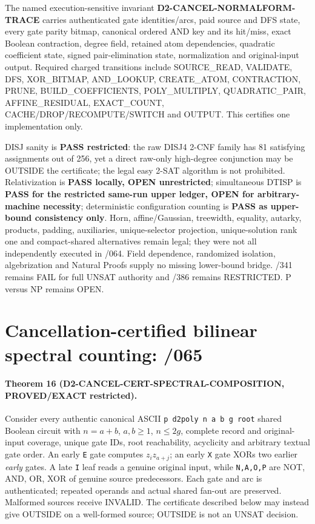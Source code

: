 \documentclass[11pt]{article}
\begin{document}
The named execution-sensitive invariant
\textbf{D2-CANCEL-NORMALFORM-TRACE} carries authenticated gate
identities/arcs, paid source and DFS state, every gate parity bitmap,
canonical ordered AND key and its hit/miss, exact Boolean
contraction, degree field, retained atom dependencies,
quadratic coefficient state, signed pair-elimination state,
normalization and original-input output.  Required charged
transitions include SOURCE\_READ, VALIDATE, DFS, XOR\_BITMAP,
AND\_LOOKUP, CREATE\_ATOM, CONTRACTION, PRUNE,
BUILD\_COEFFICIENTS, POLY\_MULTIPLY, QUADRATIC\_PAIR,
AFFINE\_RESIDUAL, EXACT\_COUNT, CACHE/DROP/RECOMPUTE/SWITCH
and OUTPUT.  This certifies one implementation only.

DISJ sanity is \textbf{PASS restricted}: the raw DISJ4 2-CNF
family has 81 satisfying assignments out of 256, yet a direct
raw-only high-degree conjunction may be OUTSIDE the certificate;
the legal easy 2-SAT algorithm is not prohibited.
Relativization is \textbf{PASS locally, OPEN unrestricted};
simultaneous DTISP is \textbf{PASS for the restricted same-run
upper ledger, OPEN for arbitrary-machine necessity};
deterministic configuration counting is \textbf{PASS as upper-bound
consistency only}.  Horn, affine/Gaussian, treewidth, equality,
autarky, products, padding, auxiliaries, unique-selector projection,
unique-solution rank one and compact-shared alternatives remain legal;
they were not all independently executed in /064.  Field
dependence, randomized isolation, algebrization and Natural
Proofs supply no missing lower-bound bridge.  /341 remains FAIL
for full UNSAT authority and /386 remains RESTRICTED.
P versus NP remains OPEN.


\section{Cancellation-certified bilinear spectral counting: /065}
\paragraph{Theorem 16 (D2-CANCEL-CERT-SPECTRAL-COMPOSITION, PROVED/EXACT restricted).}
Consider every authentic canonical ASCII \texttt{p d2poly n a b g root}
shared Boolean circuit with $n=a+b$, $a,b\ge1$, $n\le2g$, complete
record and original-input coverage, unique gate IDs, root reachability,
acyclicity and arbitrary textual gate order. An early \texttt{E} gate
computes $z_i z_{a+j}$; an early \texttt{X} gate XORs two earlier
\emph{early} gates. A late \texttt{I} leaf reads a genuine original
input, while \texttt{N,A,O,P} are NOT, AND, OR, XOR of genuine
source predecessors. Each gate and arc is authenticated; repeated
operands and actual shared fan-out are preserved. Malformed sources
receive INVALID. The certificate described below may instead give
OUTSIDE on a well-formed source; OUTSIDE is not an UNSAT decision.
\end{document}

